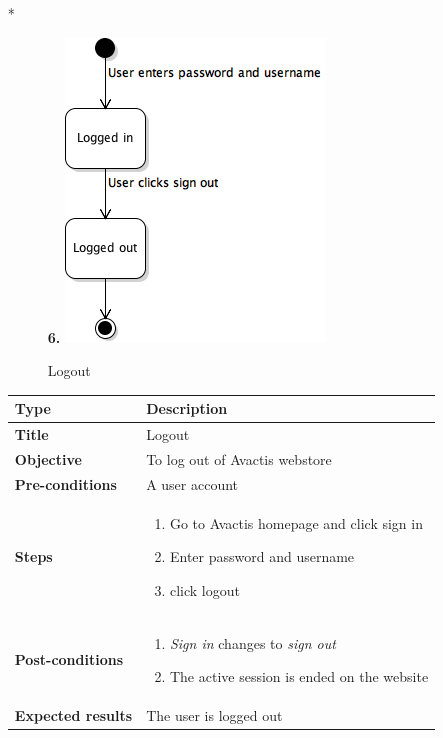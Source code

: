 \documentclass[UKenglish,12pt]{article}
\begin{document}
\begin{itemize}
\item[*]
\begin{figure}[!htbp]
\textbf{6.\newline}
\centering
\includegraphics[scale=0.55,keepaspectratio]{Images/Logout.png}
\caption{Logout}
\end{figure}


\begin{table}[!htbp]
\small
\begin{tabular}{| p{5cm} | p{10cm} | }
	\hline
	\textbf{Type} & \textbf{Description} \\ \hline
	 \textbf{Title} & Logout \\ \hline
	 \textbf{Objective} & To log out of Avactis webstore \\ \hline
	 \textbf{Pre-conditions} & A user account \\ \hline
	 \textbf{Steps} & \begin{enumerate} \item Go to Avactis homepage and click sign in \item Enter password and username \item click logout  \end{enumerate}\\ \hline
	 \textbf{Post-conditions} & \begin{enumerate}\item\textit{Sign in} changes to \textit{sign out} \item The active session is ended on the website \end{enumerate}  \\ \hline
	 \textbf{Expected results} & The user is logged out\\ 
	 \hline
\end{tabular} %
\end{table}


\end{itemize}
\end{document}
